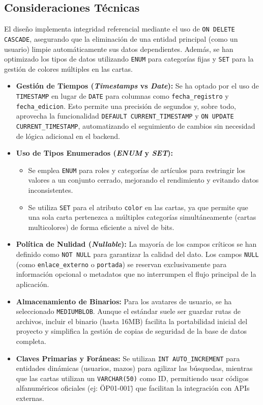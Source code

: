 \documentclass[10pt]{article}
\begin{document}
			\subsection{Consideraciones Técnicas}
			El diseño implementa integridad referencial mediante el uso de \texttt{ON DELETE CASCADE}, asegurando que la eliminación de una entidad principal (como un usuario) limpie automáticamente sus datos dependientes. Además, se han optimizado los tipos de datos utilizando \texttt{ENUM} para categorías fijas y \texttt{SET} para la gestión de colores múltiples en las cartas.
			\begin{itemize}
				\item \textbf{Gestión de Tiempos (\textit{Timestamps} vs \textit{Date}):} Se ha optado por el uso de \texttt{TIMESTAMP} en lugar de \texttt{DATE} para columnas como \texttt{fecha\_registro} y \texttt{fecha\_edicion}. Esto permite una precisión de segundos y, sobre todo, aprovecha la funcionalidad \texttt{DEFAULT CURRENT\_TIMESTAMP} y \texttt{ON UPDATE CURRENT\_TIMESTAMP}, automatizando el seguimiento de cambios sin necesidad de lógica adicional en el backend.
				
				\item \textbf{Uso de Tipos Enumerados (\textit{ENUM} y \textit{SET}):} 
				\begin{itemize}
					\item Se emplea \texttt{ENUM} para roles y categorías de artículos para restringir los valores a un conjunto cerrado, mejorando el rendimiento y evitando datos inconsistentes.
					\item Se utiliza \texttt{SET} para el atributo \texttt{color} en las cartas, ya que permite que una sola carta pertenezca a múltiples categorías simultáneamente (cartas multicolores) de forma eficiente a nivel de bits.
				\end{itemize}
				
				\item \textbf{Política de Nulidad (\textit{Nullable}):} La mayoría de los campos críticos se han definido como \texttt{NOT NULL} para garantizar la calidad del dato. Los campos \texttt{NULL} (como \texttt{enlace\_externo} o \texttt{portada}) se reservan exclusivamente para información opcional o metadatos que no interrumpen el flujo principal de la aplicación.
				
				\item \textbf{Almacenamiento de Binarios:} Para los avatares de usuario, se ha seleccionado \texttt{MEDIUMBLOB}. Aunque el estándar suele ser guardar rutas de archivos, incluir el binario (hasta 16MB) facilita la portabilidad inicial del proyecto y simplifica la gestión de copias de seguridad de la base de datos completa.
				
				\item \textbf{Claves Primarias y Foráneas:} Se utilizan \texttt{INT AUTO\_INCREMENT} para entidades dinámicas (usuarios, mazos) para agilizar las búsquedas, mientras que las cartas utilizan un \texttt{VARCHAR(50)} como ID, permitiendo usar códigos alfanuméricos oficiales (ej: \"OP01-001\") que facilitan la integración con APIs externas.
			\end{itemize}
\end{document}
